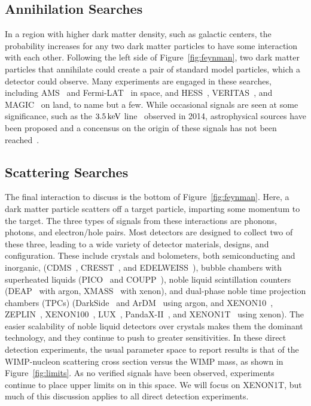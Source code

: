 \subsection{Annihilation Searches}

In a region with higher dark matter density, such as galactic centers, the probability increases for any two dark matter particles to have some interaction with each other. Following the left side of Figure~\ref{fig:feynman}, two dark matter particles that annihilate could create a pair of standard model particles, which a detector could observe. Many experiments are engaged in these searches, including AMS~\cite{Aguilar:2013} and Fermi-LAT~\cite{Ackermann:2013uma} in space, and HESS~\cite{Abramowski:2014tra}, VERITAS~\cite{Arlen:2012}, and MAGIC~\cite{Aleksic:2013xea} on land, to name but a few. While occasional signals are seen at some significance, such as the $3.5\,\mathrm{keV}$ line~\cite{Boyarsky:2014jta,Bulbul:2014sua} observed in 2014, astrophysical sources have been proposed and a concensus on the origin of these signals has not been reached~\cite{Shah:2016efh,Ahnen:2016qkx,Abdallah:2016ygi,Archambault:2017wyh,Albert:2016uux}.

\subsection{Scattering Searches}

The final interaction to discuss is the bottom of Figure~\ref{fig:feynman}. Here, a dark matter particle scatters off a target particle, imparting some momentum to the target. The three types of signals from these interactions are phonons, photons, and electron/hole pairs. Most detectors are designed to collect two of these three, leading to a wide variety of detector materials, designs, and configuration. These include crystals and bolometers, both semiconducting and inorganic, (CDMS~\cite{Akerib:2005,Agnese:2015ywx}, CRESST~\cite{Kluck:2017hnn}, and EDELWEISS~\cite{Armengaud:2009hc,Armengaud:2017rzu}), bubble chambers with superheated liquids (PICO~\cite{Amole:2015pla,Amole:2017dex} and COUPP~\cite{Manuel:2016klm}), noble liquid scintillation counters (DEAP~\cite{Amaudruz:2017ibl,Amaudruz:2017ekt} with argon, XMASS~\cite{Abe:2013tc} with xenon), and dual-phase noble time projection chambers (TPCs) (DarkSide~\cite{Agnes:2014bvk,Agnes:2015ftt} and ArDM~\cite{Marchionni:2010fi,Calvo:2015uln,Calvo:2016hve} using argon, and XENON10~\cite{Angle:2007uj}, ZEPLIN~\cite{Akimov:2011tj}, XENON100~\cite{Aprile:2011dd,Aprile:2013doa}, LUX~\cite{Akerib:2013tjd}, PandaX-II~\cite{Cui:2017nnn}, and XENON1T~\cite{Aprile:2017aty} using xenon). The easier scalability of noble liquid detectors over crystals makes them the dominant technology, and they continue to push to greater sensitivities. In these direct detection experiments, the usual parameter space to report results is that of the WIMP-nucleon scattering cross section versus the WIMP mass, as shown in Figure~\ref{fig:limits}. As no verified signals have been observed, experiments continue to place upper limits on in this space. We will focus on XENON1T, but much of this discussion applies to all direct detection experiments.

